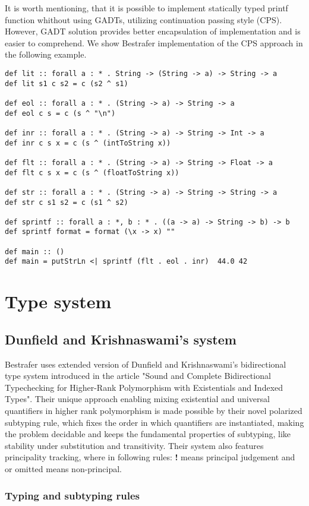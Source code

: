 \documentclass[declaration,shortabstract,english]{iithesis}
\begin{document}
It is worth mentioning, that it is possible to implement statically typed printf function
whithout using GADTs, utilizing continuation passing style (CPS)\cite{unparsing}.
However, GADT solution provides better encapsulation of implementation and
is easier to comprehend. We show Bestrafer implementation of the CPS approach in the following example.
\begin{verbatim}
def lit :: forall a : * . String -> (String -> a) -> String -> a
def lit s1 c s2 = c (s2 ^ s1)

def eol :: forall a : * . (String -> a) -> String -> a
def eol c s = c (s ^ "\n")

def inr :: forall a : * . (String -> a) -> String -> Int -> a
def inr c s x = c (s ^ (intToString x))

def flt :: forall a : * . (String -> a) -> String -> Float -> a
def flt c s x = c (s ^ (floatToString x))

def str :: forall a : * . (String -> a) -> String -> String -> a
def str c s1 s2 = c (s1 ^ s2)

def sprintf :: forall a : *, b : * . ((a -> a) -> String -> b) -> b
def sprintf format = format (\x -> x) ""

def main :: ()
def main = putStrLn <| sprintf (flt . eol . inr)  44.0 42
\end{verbatim}

\chapter{Type system}
\section{Dunfield and Krishnaswami's system}
Bestrafer uses extended version of Dunfield and Krishnaswami's bidirectional type system introduced in the article
"Sound and Complete Bidirectional Typechecking for Higher-Rank Polymorphism with Existentials and Indexed Types"\cite{gadt-popl19}.
Their unique approach enabling mixing existential and universal quantifiers in higher rank polymorphism is made possible by
their novel polarized subtyping rule, which fixes the order in which quantifiers are instantiated, making the
problem decidable and keeps the fundamental properties of subtyping,
like stability under substitution and transitivity. Their system also features principality tracking, where in following
rules: \textbf{!} means principal judgement and \cancel{\textbf{!}} or omitted means non-principal.
\subsection*{Typing and subtyping rules}
\end{document}
